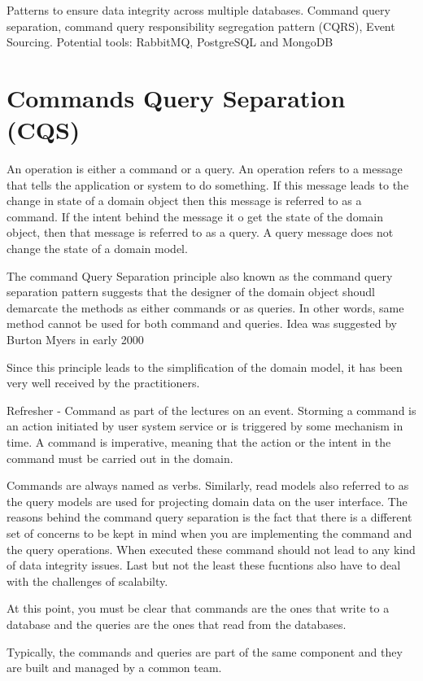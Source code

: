 Patterns to ensure data integrity across multiple databases.
Command query separation, command query responsibility segregation pattern (CQRS), Event Sourcing.
Potential tools: RabbitMQ, PostgreSQL and MongoDB

\section{Commands Query Separation (CQS)}
An operation is either a command or a query.
An operation refers to a message that tells the application or system to do something.
If this message leads to the change in state of a domain object then this message is referred to as a command.
If the intent behind the message it o get the state of the domain object, then that message is referred to as a query.
A query message does not change the state of a domain model.

The command Query Separation principle also known as the command query separation pattern suggests that the designer of the domain object shoudl demarcate the methods as either commands or as queries.
In other words, same method cannot be used for both command and queries.
Idea was suggested by Burton Myers in early 2000

Since this principle leads to the simplification of the domain model, it has been very well received by the practitioners.

Refresher - Command as part of the lectures on an event.
Storming a command is an action initiated by user system service or is triggered by some mechanism in time.
A command is imperative, meaning that the action or the intent in the command must be carried out in the domain.

Commands are always named as verbs.
Similarly, read models also referred to as the query models are used for projecting domain data on the user interface.
The reasons behind the command query separation is the fact that there is a different set of concerns to be kept in mind when you are implementing the command and the query operations.
When executed these command should not lead to any kind of data integrity issues.
Last but not the least these fucntions also have to deal with the challenges of scalabilty.

At this point, you must be clear that commands are the ones that write to a database and the queries are the ones that read from the databases.

Typically, the commands and queries are part of the same component and they are built and managed by a common team.

